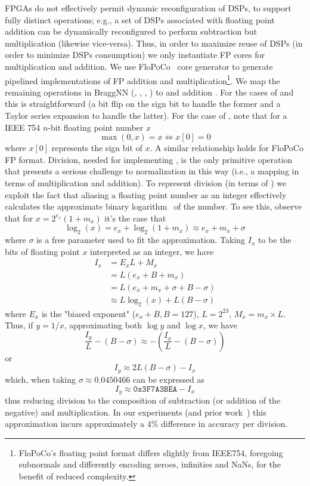 {{{{FPGAs do not effectively permit dynamic reconfiguration of DSPs, to support fully distinct operations; e.g., a set of DSPs associated with floating point addition can be dynamically reconfigured to perform subtraction but multiplication (likewise vice-versa).
Thus, in order to maximize reuse of DSPs (in order to minimize DSPs consumption) we only instantiate FP cores for multiplication and addition.
We use FloPoCo~\cite{8877424} core generator to generate pipelined implementations of FP addition and multiplication\footnote{FloPoCo's floating point format differs slightly from IEEE754, foregoing subnormals and differently encoding zeroes, infinities and NaNs, for the benefit of reduced complexity.}.
We map the remaining operations in BraggNN (, , , ) to  and addition .
For the cases of  and  this is straightforward (a bit flip on the sign bit to handle the former and a Taylor series expansion to handle the latter).
For the case of , note that for a IEEE 754 $n$-bit floating point number $x$
$$
\max(0, x) = x \iff x[0] = 0
$$
where $x[0]$ represents the sign bit of $x$.
A similar relationship holds for FloPoCo FP format.
Division, needed for implementing , is the only primitive operation that presents a serious challenge to normalization in this way (i.e., a mapping in terms of multiplication and addition).
To represent division (in terms of ) we exploit the fact that aliasing a floating point number as an integer effectively calculates the approximate binary logarithm~\cite{enwiki:1081681080} of the number.
To see this, observe that for $x=2^{e_{x}}(1+m_{x})$ it's the case that
\[
	\log _{2}(x)=e_{x}+\log _{2}(1+m_{x})	\approx e_{x} + m_x + \sigma
\]
where $\sigma$ is a free parameter used to fit the approximation.
Taking $I_x$ to be the bits of floating point $x$ interpreted as an integer, we have 
\[
\begin{aligned}
	I_{x}&=E_{x}L+M_{x}\\
	&=L(e_{x}+B+m_{x})\\
	&=L(e_{x}+m_{x}+\sigma +B-\sigma )\\
	&\approx L\log _{2}(x)+L(B-\sigma )
\end{aligned}
\]
where $E_{x}$ is the "biased exponent" ($e_x + B, B = 127$), $L = 2^{23}$, $M_{x}=m_{x}\times L$.
Thus, if $y = 1/x$, approximating both $\log y$ and $\log x$, we have 
\[
	{\frac {I_{y}}{L}}-(B-\sigma )\approx -\left({\frac {I_{x}}{L}}-(B-\sigma )\right)	
\]
or
\[
	I_{y}\approx 2 L(B-\sigma ) - I_{x}
\]
which, when taking $\sigma \approx 0.0450466$ can be expressed as 
\[
	I_y \approx \texttt{0x3F7A3BEA} - I_x
\]
thus reducing division to the composition of subtraction (or addition of the negative) and multiplication.
In our experiments (and prior work~\cite{10.1007/978-0-387-72258-0_14}) this approximation incurs approximately a $4\%$ difference in accuracy per division.

}}}}
